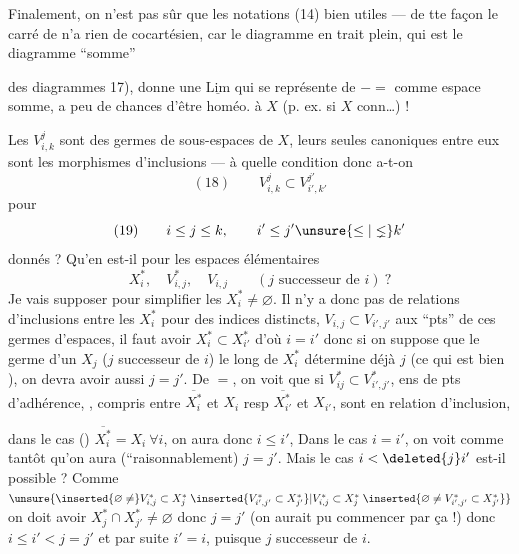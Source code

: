 Finalement, on n'est pas sûr que
les notations (14)  bien utiles —
de tte façon le carré de  n'a
rien de cocartésien, car le diagramme en
trait plein, qui est le diagramme ``somme''

des diagrammes 17), donne une $\underline{\mathrm{Lim}}$ qui se
représente de $-=$ comme espace somme, a peu
de chances d'être homéo. à $X$ (p. ex. si $X$ conn\ldots) !

Les $V_{i,k}^j$ sont des germes de sous-espaces
de $X$, leurs seules   canoniques
entre eux sont les morphismes d'inclusions
— à quelle condition donc a-t-on
\[
(18)\qquad V_{i,k}^j\subset V_{i',k'}^{j'}
\]
pour
\[
(19)\qquad i\leq j\leq k,\qquad i'\leq j'\unsure{\leq|\lneq}k'
\]
donnés ? Qu'en est-il pour les espaces
élémentaires
\[
X_i^*,\quad V_{i,j}^*,\quad V_{i,j}\qquad(j\text{ successeur de }i)\ ?
\]
Je vais supposer pour simplifier les $X_i^*\ne\varnothing$.
Il n'y a donc pas de relations d'inclusions entre
les $X_i^*$ pour des indices distincts,  
$V_{i,j}\subset V_{i',j'}$  aux ``pts''  de ces germes
d'espaces, il faut avoir $X_i^*\subset X_{i'}^*$ d'où $i=i'$
donc si on suppose que le germe d'un
$X_j$ ($j$ successeur de $i$) le long de $X_i^*$ détermine
déjà $j$ (ce qui est bien ), on
devra avoir aussi $j=j'$. De $=$, on voit que
si $V_{ij}^*\subset V_{i',j'}^*$,  ens de pts d'adhérence,
, compris entre $\overline{X_i^*}$ et $X_i$
resp $\overline{X_{i'}^*}$ et $X_{i'}$, sont en relation d'inclusion,

dans le cas ()  $\overline{X_i^*}=X_i\ \forall i$, on aura donc $i\leq i'$, Dans  le cas $i=i'$, on voit comme tantôt qu'on aura (``raisonnablement) $j=j'$. Mais le cas $i<\deleted{j}i'$ est-il possible ? Comme $\unsure{\inserted{\varnothing\ne}V_{i,j}^*\subset X_j^*\;\inserted{V_{i',j'}^*\subset X_{j'}^*}|V_{i,j}^*\subset X_j^*\;\inserted{\varnothing\ne V_{i',j'}^*\subset X_{j'}^*}}$ on doit avoir $X_j^*\cap X_{j'}^*\ne\varnothing$ donc $j=j'$ (on aurait pu commencer par ça !)
donc  $i\leq i'<j=j'$ et par suite $i'=i$, puisque $j$ successeur de $i$.

